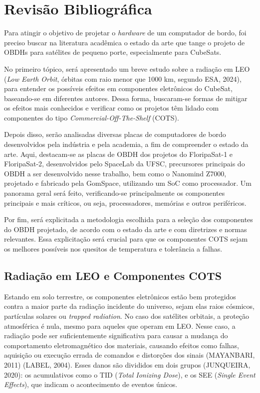\chapter{Revisão Bibliográfica}

Para atingir o objetivo de projetar o \textit{hardware} de um computador de bordo, foi preciso buscar na literatura acadêmica o estado da arte que tange o projeto de OBDHs para satélites de pequeno porte, especialmente para CubeSats.
 
No primeiro tópico, será apresentado um breve estudo sobre a radiação em LEO (\textit{Low Earth Orbit}, órbitas com raio menor que 1000 km, segundo ESA, 2024), para entender os possíveis efeitos em componentes eletrônicos do CubeSat, baseando-se em diferentes autores. Dessa forma, buscaram-se formas de mitigar os efeitos mais conhecidos e verificar como os projetos têm lidado com componentes do tipo \textit{Commercial-Off-The-Shelf} (COTS).%

Depois disso, serão analisadas diversas placas de computadores de bordo desenvolvidos pela indústria e pela academia, a fim de compreender o estado da arte. Aqui, destacam-se as placas de OBDH dos projetos do FloripaSat-1 e FloripaSat-2, desenvolvidos pelo SpaceLab da UFSC, precursores principais do OBDH a ser desenvolvido nesse trabalho, bem como o Nanomind Z7000, projetado e fabricado pela GomSpace, utilizando um SoC como processador. Um panorama geral será feito, verificando-se principalmente os componentes principais e mais críticos, ou seja, processadores, memórias e outros periféricos.

Por fim, será explicitada a metodologia escolhida para a seleção dos componentes do OBDH projetado, de acordo com o estado da arte e com diretrizes e normas relevantes. Essa explicitação será crucial para que os componentes COTS sejam os melhores possíveis nos quesitos de temperatura e tolerância a falhas.

\section{Radiação em LEO e Componentes COTS}

Estando em solo terrestre, os componentes eletrônicos estão bem protegidos contra a maior parte da radiação incidente do universo, sejam elas raios cósmicos, partículas solares ou \textit{trapped radiation}. No caso dos satélites orbitais, a proteção atmosférica é nula, mesmo para aqueles que operam em LEO. Nesse caso, a radiação pode ser suficientemente significativa para causar a mudança do comportamento eletromagnético dos materiais, causando efeitos como falhas, aquisição ou execução errada de comandos e distorções dos sinais (MAYANBARI, 2011) (LABEL, 2004).  Esses danos são divididos em dois grupos (JUNQUEIRA, 2020): os acumulativos como o TID (\textit{Total Ionizing Dose}), e os SEE (\textit{Single Event Effects}), que indicam o acontecimento de eventos únicos. 

